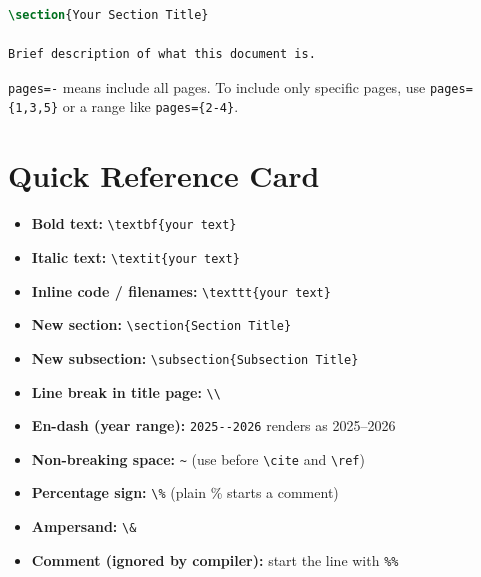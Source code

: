 \documentclass[12pt,a4paper]{report}
\begin{document}
\begin{lstlisting}[language=TeX, caption={Attaching a PDF to the Appendix}]
\section{Your Section Title}

Brief description of what this document is.


\end{lstlisting}

\texttt{pages=-} means include all pages. To include only specific pages, use \texttt{pages=\{1,3,5\}} or a range like \texttt{pages=\{2-4\}}.

\section{Quick Reference Card}

\begin{itemize}
    \item \textbf{Bold text:} \texttt{\textbackslash textbf\{your text\}}
    \item \textbf{Italic text:} \texttt{\textbackslash textit\{your text\}}
    \item \textbf{Inline code / filenames:} \texttt{\textbackslash texttt\{your text\}}
    \item \textbf{New section:} \texttt{\textbackslash section\{Section Title\}}
    \item \textbf{New subsection:} \texttt{\textbackslash subsection\{Subsection Title\}}
    \item \textbf{Line break in title page:} \texttt{\textbackslash\textbackslash}
    \item \textbf{En-dash (year range):} \texttt{2025\texttt{-{}-}2026} renders as 2025--2026
    \item \textbf{Non-breaking space:} \texttt{\textasciitilde} (use before \texttt{\textbackslash cite} and \texttt{\textbackslash ref})
    \item \textbf{Percentage sign:} \texttt{\textbackslash\%} (plain \% starts a comment)
    \item \textbf{Ampersand:} \texttt{\textbackslash\&}
    \item \textbf{Comment (ignored by compiler):} start the line with \texttt{\%\%}
\end{itemize}

\end{document}
